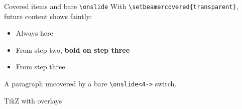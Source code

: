 \begin{frame}{Covered items and bare \texttt{\textbackslash onslide}}
  With \texttt{\textbackslash setbeamercovered\{transparent\}}, future content shows faintly:
  \begin{itemize}
    \item<1-> Always here
    \item<2-> From step two, \textbf<3>{bold on step three}
    \item<3-> From step three
  \end{itemize}
  A paragraph uncovered by a bare \texttt{\textbackslash onslide<4->} switch.
\end{frame}

\begin{frame}{TikZ with overlays}
  \begin{center}
  \end{center}
\end{frame}
